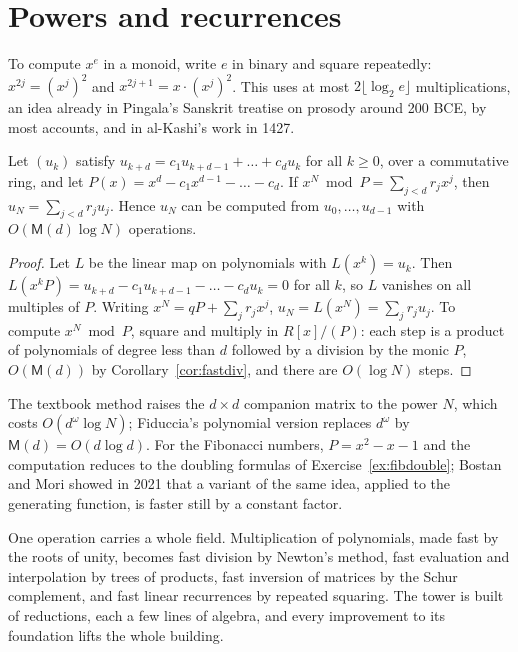 \section{Powers and recurrences}\label{sec:recurrences}

To compute $x^e$ in a monoid, write $e$ in binary and square repeatedly: $x^{2j}=(x^j)^2$ and $x^{2j+1}=x\cdot(x^j)^2$. This uses at most $2\lfloor\log_2e\rfloor$ multiplications, an idea already in Pingala's Sanskrit treatise on prosody around 200 BCE, by most accounts, and in al-Kashi's work in 1427.

\begin{theorem}[Fiduccia, 1985]\label{thm:fiduccia}
Let $(u_k)$ satisfy $u_{k+d}=c_1u_{k+d-1}+\dots+c_du_k$ for all $k\ge0$, over a commutative ring, and let $P(x)=x^d-c_1x^{d-1}-\dots-c_d$. If $x^N\bmod P=\sum_{j<d}r_jx^j$, then $u_N=\sum_{j<d}r_ju_j$. Hence $u_N$ can be computed from $u_0,\dots,u_{d-1}$ with $O(\mathsf M(d)\log N)$ operations.
\end{theorem}
\begin{proof}
Let $L$ be the linear map on polynomials with $L(x^k)=u_k$. Then $L(x^kP)=u_{k+d}-c_1u_{k+d-1}-\dots-c_du_k=0$ for all $k$, so $L$ vanishes on all multiples of $P$. Writing $x^N=qP+\sum_jr_jx^j$, $u_N=L(x^N)=\sum_jr_ju_j$. To compute $x^N\bmod P$, square and multiply in $R[x]/(P)$: each step is a product of polynomials of degree less than $d$ followed by a division by the monic $P$, $O(\mathsf M(d))$ by
Corollary~\ref{cor:fastdiv}, and there are $O(\log N)$ steps.
\end{proof}

The textbook method raises the $d\times d$ companion matrix to the power $N$, which costs $O(d^\omega\log N)$; Fiduccia's polynomial version replaces $d^\omega$ by $\mathsf M(d)=O(d\log d)$. For the Fibonacci numbers, $P=x^2-x-1$ and the computation reduces to the doubling formulas of Exercise~\ref{ex:fibdouble}; Bostan and Mori showed in 2021 that a variant of the same idea, applied to the generating function, is faster still by a constant factor.

\begin{beauty}
One operation carries a whole field. Multiplication of polynomials, made fast by the roots of unity, becomes fast division by Newton's method, fast evaluation and interpolation by trees of products, fast inversion of matrices by the Schur complement, and fast linear recurrences by repeated squaring. The tower is built of
reductions, each a few lines of algebra, and every improvement to its foundation lifts the whole building.
\end{beauty}

